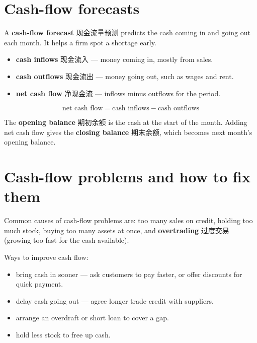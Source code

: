 \documentclass[11pt]{article}
\begin{document}
\section*{Cash-flow forecasts}

A \textbf{cash-flow forecast} 现金流量预测 predicts the cash coming in and going out each month. It helps a firm spot a shortage early.

\begin{itemize}
\item \textbf{cash inflows} 现金流入 — money coming in, mostly from sales.

\item \textbf{cash outflows} 现金流出 — money going out, such as wages and rent.

\item \textbf{net cash flow} 净现金流 — inflows minus outflows for the period.

\end{itemize}

\[
\text{net cash flow} = \text{cash inflows} - \text{cash outflows}
\]

The \textbf{opening balance} 期初余额 is the cash at the start of the month. Adding net cash flow gives the \textbf{closing balance} 期末余额, which becomes next month's opening balance.

\section*{Cash-flow problems and how to fix them}

Common causes of cash-flow problems are: too many sales on credit, holding too much stock, buying too many assets at once, and \textbf{overtrading} 过度交易 (growing too fast for the cash available).

Ways to improve cash flow:

\begin{itemize}
\item bring cash in sooner — ask customers to pay faster, or offer discounts for quick payment.

\item delay cash going out — agree longer trade credit with suppliers.

\item arrange an overdraft or short loan to cover a gap.

\item hold less stock to free up cash.

\end{itemize}
\end{document}
